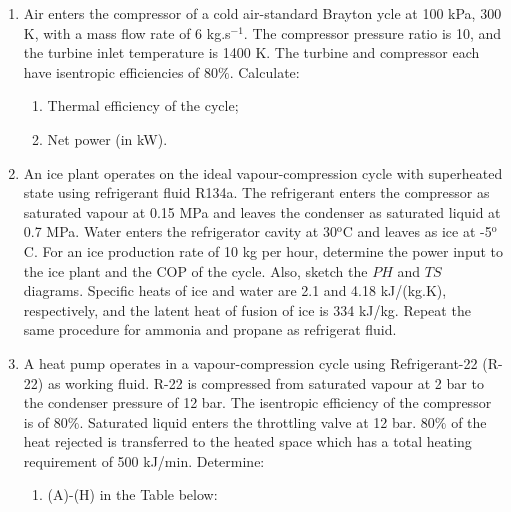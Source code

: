 \documentclass[12pts,a4paper,amsmath,amssymb,floatfix]{article}%
\begin{document}
\begin{enumerate}[label=\bfseries Problem \arabic*]
\item Air enters the compressor of a cold air-standard Brayton ycle at 100 kPa, 300 K, with a mass flow rate of 6 kg.s$^{-1}$. The compressor pressure ratio is 10, and the turbine inlet temperature is 1400 K. The turbine and compressor each have isentropic efficiencies of 80$\%$. Calculate:
\begin{enumerate}
\item Thermal efficiency of the cycle;
\item Net power (in kW).
\end{enumerate}


\item \label{Ex5} An ice plant operates on the ideal vapour-compression cycle with superheated state using refrigerant fluid R134a.  The refrigerant enters the compressor as saturated vapour at 0.15 MPa and leaves the condenser as saturated liquid at 0.7 MPa.  Water enters the refrigerator cavity at 30$^{\text{o}}$C and leaves as ice at -5$^{\text{o}}$C. For an ice production rate of 10 kg per hour, determine the power input to the ice plant and the COP of the cycle. Also, sketch the $PH$ and $TS$ diagrams. Specific heats of ice and water are 2.1 and 4.18 kJ/(kg.K), respectively, and the latent heat of fusion of ice is 334 kJ/kg. Repeat the same procedure for ammonia and propane as refrigerat fluid.



\item \label{Ex10} A heat pump operates in a vapour-compression cycle using Refrigerant-22 (R-22) as working fluid.  R-22 is compressed from saturated vapour at 2 bar to the condenser pressure of 12 bar.  The isentropic efficiency of the compressor is of 80$\%$. Saturated liquid enters the throttling valve at 12 bar. 80$\%$ of the heat rejected is transferred to the heated space which has a total heating requirement of 500 kJ/min. Determine:
\begin{enumerate}
\item (A)-(H) in the Table below:


\end{enumerate}
\end{enumerate}
\end{document}
